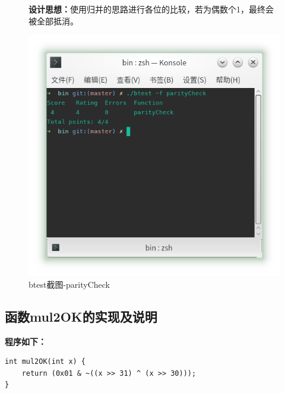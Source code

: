 \begin{figure}[H]
    \begin{minipage}[c]{0.5\linewidth}
        \textbf{设计思想：}使用归并的思路进行各位的比较，若为偶数个1，最终会被全部抵消。
    \end{minipage}
    \begin{minipage}[c]{0.4\linewidth}
        \centering
        \includegraphics[width=0.9\linewidth]{figures/parityCheck}
        \caption{btest截图-parityCheck}
        \label{fig:parityCheck}
    \end{minipage}
\end{figure}

\subsection{函数mul2OK的实现及说明}
\textbf{程序如下：}

\begin{verbatim}
int mul2OK(int x) {
    return (0x01 & ~((x >> 31) ^ (x >> 30)));
}
\end{verbatim}

